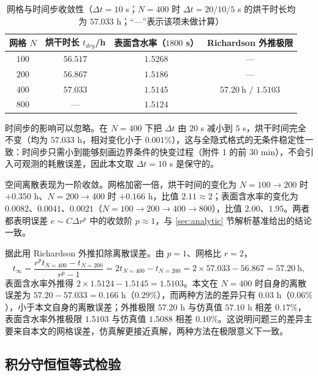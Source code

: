 \documentclass[12pt,a4paper]{article}
\begin{document}
\begin{center}
\begin{table}[H]
\centering
\caption{网格与时间步收敛性（$\Delta t=10$ s；$N=400$ 时 $\Delta t=20/10/5$ s 的烘干时长均为 $57.033$ h；“---”表示该项未做计算）}
\label{tab:convergence}
\small
\begin{tabular}{cccc}
\toprule
网格 $N$ & 烘干时长 $t_{dry}$/h & 表面含水率（$1800$ s） & Richardson 外推极限\\
\midrule
$100$ & $56.517$ & $1.5268$ & ---\\
$200$ & $56.867$ & $1.5186$ & ---\\
$400$ & $57.033$ & $1.5145$ & $57.20\ \mathrm{h}$ \;/\; $1.5103$\\
$800$ & --- & $1.5124$ & \\
\bottomrule
\end{tabular}
\end{table}

时间步的影响可以忽略。在 $N=400$ 下把 $\Delta t$ 由 $20$ s 减小到 $5$ s，烘干时间完全不变（均为 $57.033$ h，相对变化小于 $0.001\%$），这与全隐式格式的无条件稳定性一致：时间步只需小到能够刻画边界条件的快变过程（附件 1 的前 $30$ min），不会引入可观测的耗散误差，因此本文取 $\Delta t=10$ s 是保守的。

空间离散表现为一阶收敛。网格加密一倍，烘干时间的变化为 $N{=}100\to200$ 时 $+0.350$ h、$N{=}200\to400$ 时 $+0.166$ h，比值 $2.11\approx2$；表面含水率的变化为 $0.0082$、$0.0041$、$0.0021$（$N{=}100\to200\to400\to800$），比值 $2.00$、$1.95$。两者都表明误差 $e\sim C\Delta r^{p}$ 中的收敛阶 $p\approx1$，与 \ref{sec:analytic} 节解析基准给出的结论一致。

据此用 Richardson 外推扣除离散误差。由 $p=1$、网格比 $r=2$，
\begin{equation}
t_{\infty}=\frac{r^{p}t_{N=400}-t_{N=200}}{r^{p}-1}=2t_{N=400}-t_{N=200}=2\times57.033-56.867=57.20\ \mathrm{h},
\end{equation}
表面含水率外推得 $2\times1.5124-1.5145=1.5103$。本文在 $N=400$ 时自身的离散误差为 $57.20-57.033=0.166$ h（$0.29\%$），而两种方法的差异只有 $0.03$ h（$0.06\%$），小于本文自身的离散误差；外推极限 $57.20$ h 与仿真值 $57.10$ h 相差 $0.17\%$，表面含水率外推极限 $1.5103$ 与仿真值 $1.5088$ 相差 $0.10\%$。这说明问题三的差异主要来自本文的网格误差，仿真解更接近真解，两种方法在极限意义下一致。

\subsection{积分守恒恒等式检验}


\end{center}
\end{document}
